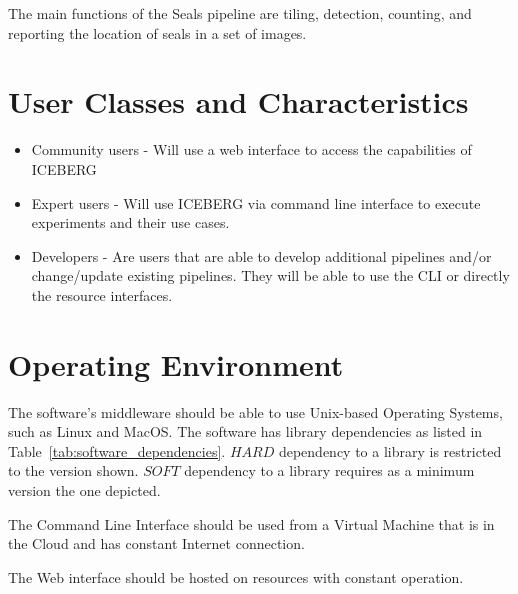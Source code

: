 \documentclass{scrreprt}
\begin{document}
The main functions of the Seals pipeline are tiling, detection, counting, and reporting 
the location of seals in a set of images.

\section{User Classes and Characteristics}
\iffalse
$<$Identify the various user classes that you anticipate will use this product.  
User classes may be differentiated based on frequency of use, subset of product 
functions used, technical expertise, security or privilege levels, educational 
level, or experience. Describe the pertinent characteristics of each user class.  
Certain requirements may pertain only to certain user classes. Distinguish the 
most important user classes for this product from those who are less important 
to satisfy.$>$
\fi
\begin{itemize}
	\item Community users - Will use a web interface to access the capabilities
	of ICEBERG
	\item Expert users - Will use ICEBERG via command line interface to execute 
	experiments and their use cases.
	\item Developers - Are users that are able to develop additional pipelines 
	and/or change/update existing pipelines. They will be able to use the CLI or 
	directly the resource interfaces.
\end{itemize}

\section{Operating Environment}
\iffalse
$<$Describe the environment in which the software will operate, including the 
hardware platform, operating system and versions, and any other software 
components or applications with which it must peacefully coexist.$>$
\fi
The software's middleware should be able to use Unix-based Operating Systems, such 
as Linux and MacOS. The software has library dependencies as listed in 
Table~\ref{tab:software_dependencies}. $HARD$ dependency to a library is restricted 
to the version shown. $SOFT$ dependency to a library requires as a minimum version 
the one depicted.

The Command Line Interface should be used from a Virtual Machine that is in the 
Cloud and has constant Internet connection.

The Web interface should be hosted on resources with constant operation.
\end{document}

